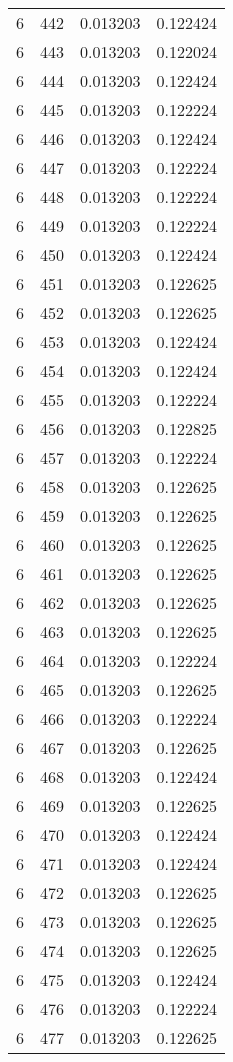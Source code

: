 \begin{longtable}{rrrr}
6 & 442 & 0.013203 & 0.122424 \\
6 & 443 & 0.013203 & 0.122024 \\
6 & 444 & 0.013203 & 0.122424 \\
6 & 445 & 0.013203 & 0.122224 \\
6 & 446 & 0.013203 & 0.122424 \\
6 & 447 & 0.013203 & 0.122224 \\
6 & 448 & 0.013203 & 0.122224 \\
6 & 449 & 0.013203 & 0.122224 \\
6 & 450 & 0.013203 & 0.122424 \\
6 & 451 & 0.013203 & 0.122625 \\
6 & 452 & 0.013203 & 0.122625 \\
6 & 453 & 0.013203 & 0.122424 \\
6 & 454 & 0.013203 & 0.122424 \\
6 & 455 & 0.013203 & 0.122224 \\
6 & 456 & 0.013203 & 0.122825 \\
6 & 457 & 0.013203 & 0.122224 \\
6 & 458 & 0.013203 & 0.122625 \\
6 & 459 & 0.013203 & 0.122625 \\
6 & 460 & 0.013203 & 0.122625 \\
6 & 461 & 0.013203 & 0.122625 \\
6 & 462 & 0.013203 & 0.122625 \\
6 & 463 & 0.013203 & 0.122625 \\
6 & 464 & 0.013203 & 0.122224 \\
6 & 465 & 0.013203 & 0.122625 \\
6 & 466 & 0.013203 & 0.122224 \\
6 & 467 & 0.013203 & 0.122625 \\
6 & 468 & 0.013203 & 0.122424 \\
6 & 469 & 0.013203 & 0.122625 \\
6 & 470 & 0.013203 & 0.122424 \\
6 & 471 & 0.013203 & 0.122424 \\
6 & 472 & 0.013203 & 0.122625 \\
6 & 473 & 0.013203 & 0.122625 \\
6 & 474 & 0.013203 & 0.122625 \\
6 & 475 & 0.013203 & 0.122424 \\
6 & 476 & 0.013203 & 0.122224 \\
6 & 477 & 0.013203 & 0.122625 \\

\end{longtable}
